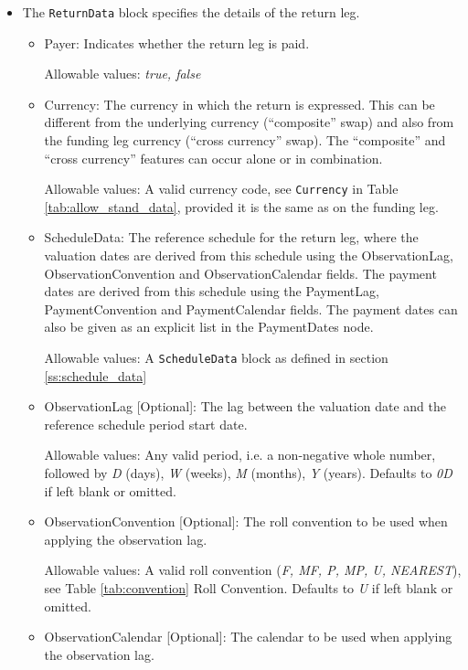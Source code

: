 \begin{itemize}
\item The {\tt ReturnData} block specifies the details of the return leg.
  \begin{itemize}
  \item Payer: Indicates whether the return leg is paid.
  
    Allowable values: \emph{true, false}
    
  \item Currency: The currency in which the return is expressed. This can be different from the underlying currency
    (``composite'' swap) and also from the funding leg currency (``cross currency'' swap). The ``composite'' and ``cross
    currency'' features can occur alone or in combination.
    
    Allowable values: A valid currency code, see \lstinline!Currency! in Table \ref{tab:allow_stand_data}, provided it is the same as on the funding leg.
    
  \item ScheduleData: The reference schedule for the return leg, where the valuation dates are derived from this schedule
    using the ObservationLag, ObservationConvention and ObservationCalendar fields. The payment dates are derived from
    this schedule using the PaymentLag, PaymentConvention and PaymentCalendar fields. The payment dates can also be
    given as an explicit list in the PaymentDates node.
    
    Allowable values: A \lstinline!ScheduleData! block as defined in section \ref{ss:schedule_data}
    
  \item ObservationLag [Optional]: The lag between the valuation date and the reference schedule period start date.
  
    Allowable values: Any valid period, i.e. a non-negative whole number, followed by \emph{D} (days), \emph{W} (weeks), \emph{M} (months), \emph{Y} (years). Defaults to \emph{0D} if left blank or omitted.
    
  \item ObservationConvention [Optional]: The roll convention to be used when applying the observation lag.
  
    Allowable values: A valid roll convention (\emph{F, MF, P, MP, U, NEAREST}), see Table \ref{tab:convention} Roll Convention. Defaults to \emph{U} if left blank or omitted.
    
  \item ObservationCalendar [Optional]: The calendar to be used when applying the observation lag.
  

\end{itemize}
\end{itemize}
